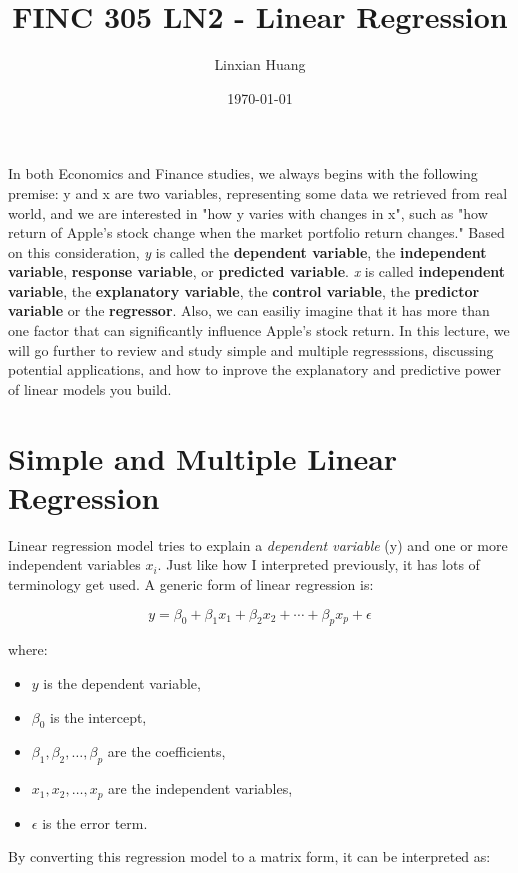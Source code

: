 \documentclass[11pt]{article}
\title{FINC 305 LN2 - Linear Regression}
\author{Linxian Huang}
\date{\today}
\begin{document}
\maketitle
   In both Economics and Finance studies, we always begins with the following premise: y and x are two variables, 
   representing some data we retrieved from real world, and we are interested in "how y varies with changes in x", 
   such as "how return of Apple's stock change when the market portfolio return changes." Based on this consideration, 
   \textit{y} is called the \textbf{dependent variable}, the \textbf{independent variable}, \textbf{response variable}, or
   \textbf{predicted variable}. \textit{x} is called \textbf{independent variable}, the \textbf{explanatory variable}, 
   the \textbf{control variable}, the \textbf{predictor variable} or the \textbf{regressor}. Also, we can easiliy imagine that
   it has more than one factor that can significantly influence Apple's stock return. In this lecture, we will go further
   to review and study simple and multiple regresssions, discussing potential applications, and how to inprove the explanatory 
   and predictive power of linear models you build. \\

\section{Simple and Multiple Linear Regression}

Linear regression model tries to explain a \textit{dependent variable} (y) and one or more independent variables $x_i$. Just like 
how I interpreted previously, it has lots of terminology get used. A generic form of linear regression is:

\[
y = \beta_0 + \beta_1 x_1 + \beta_2 x_2 + \cdots + \beta_p x_p + \epsilon
\]

where:
\begin{itemize}
    \item \(y\) is the dependent variable,
    \item \(\beta_0\) is the intercept,
    \item \(\beta_1, \beta_2, \dots, \beta_p\) are the coefficients,
    \item \(x_1, x_2, \dots, x_p\) are the independent variables,
    \item \(\epsilon\) is the error term.
\end{itemize}

By converting this regression model to a matrix form, it can be interpreted as:
\end{document}
